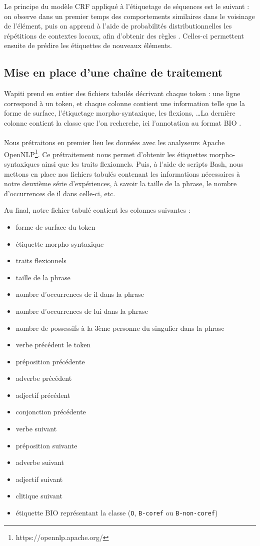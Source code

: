 \documentclass[a4paper,12pt]{article}
\begin{document}
Le principe du modèle CRF appliqué à l'étiquetage de séquences est le suivant : on observe dans un premier temps des comportements similaires dans le voisinage de l'élément, puis on apprend à l'aide de probabilités distributionnelles les répétitions de contextes locaux, afin d'obtenir des \og règles \fg{}. Celles-ci permettent ensuite de prédire les étiquettes de nouveaux éléments.


\subsection{Mise en place d'une chaîne de traitement}

Wapiti prend en entier des fichiers tabulés décrivant chaque token : une ligne correspond à un token, et chaque colonne contient une information telle que la forme de surface, l'étiquetage morpho-syntaxique, les flexions, \ldots La dernière colonne contient la classe que l'on recherche, ici l'annotation au format BIO .

\paragraph{}
Nous prétraitons en premier lieu les données avec les analyseurs Apache OpenNLP\footnote{https://opennlp.apache.org/}\cite{boudin:detection:taln12}. 
Ce prétraitement nous permet d'obtenir les étiquettes morpho-syntaxiques ainsi que les traits flexionnels.
Puis, à l'aide de scripts Bash, nous mettons en place nos fichiers tabulés contenant les informations nécessaires à notre deuxième série d'expériences, à savoir la taille de la phrase, le nombre d'occurrences de \og il \fg{} dans celle-ci, etc.

Au final, notre fichier tabulé contient les colonnes suivantes : \\
\begin{itemize} 
\item forme de surface du token
\item étiquette morpho-syntaxique
\item traits flexionnels
\item taille de la phrase
\item nombre d'occurrences de \og il \fg{} dans la phrase
\item nombre d'occurrences de \og lui \fg{} dans la phrase
\item nombre de possessifs à la 3ème personne du singulier dans la phrase
\item verbe précédent le token
\item préposition précédente
\item adverbe précédent
\item adjectif précédent
\item  conjonction précédente
\item verbe suivant
\item préposition suivante
\item adverbe suivant
\item adjectif suivant
\item clitique suivant
\item étiquette BIO représentant la classe (\verb!O!, \verb!B-coref! ou \verb!B-non-coref!)
\end{itemize} 
\end{document}
